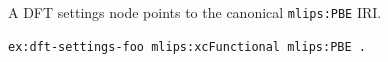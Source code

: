 A DFT settings node points to the canonical \texttt{mlips:PBE} IRI.
\begin{lstlisting}[language=turtle]
ex:dft-settings-foo mlips:xcFunctional mlips:PBE .
\end{lstlisting}
